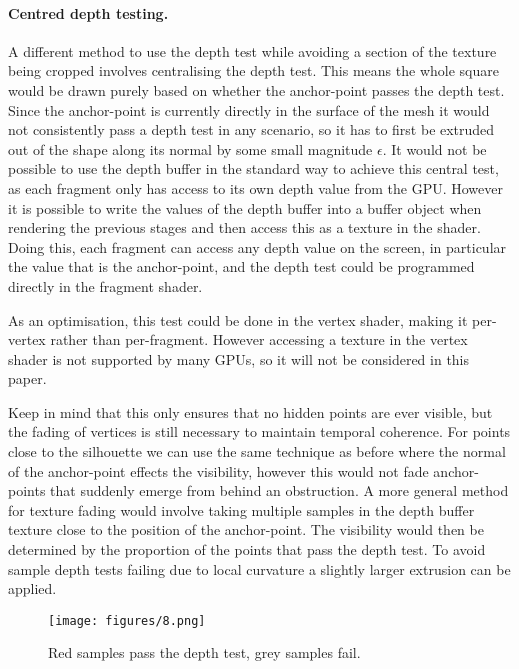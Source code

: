 \documentclass[a4paper, 12pt]{article}
\begin{document}
\paragraph{Centred depth testing.}
A different method to use the depth test while avoiding a section of the texture being cropped involves centralising the depth test. This means the whole square would be drawn purely based on whether the anchor-point passes the depth test. Since the anchor-point is currently directly in the surface of the mesh it would not consistently pass a depth test in any scenario, so it has to first be extruded out of the shape along its normal by some small magnitude $\epsilon$. It would not be possible to use the depth buffer in the standard way to achieve this central test, as each fragment only has access to its own depth value from the GPU. However it is possible to write the values of the depth buffer into a buffer object when rendering the previous stages and then access this as a texture in the shader. Doing this, each fragment can access any depth value on the screen, in particular the value that is the anchor-point, and the depth test could be programmed directly in the fragment shader.

As an optimisation, this test could be done in the vertex shader, making it per-vertex rather than per-fragment. However accessing a texture in the vertex shader is not supported by many GPUs, so it will not be considered in this paper.

Keep in mind that this only ensures that no hidden points are ever visible, but the fading of vertices is still necessary to maintain temporal coherence. For points close to the silhouette we can use the same technique as before where the normal of the anchor-point effects the visibility, however this would not fade anchor-points that suddenly emerge from behind an obstruction. A more general method for texture fading would involve taking multiple samples in the depth buffer texture close to the position of the anchor-point. The visibility would then be determined by the proportion of the points that pass the depth test. To avoid sample depth tests failing due to local curvature a slightly larger extrusion can be applied.

\begin{figure}
  \centering
  \texttt{[image: figures/8.png]}
  \caption{Red samples pass the depth test, grey samples fail.}
\end{figure}
\end{document}
